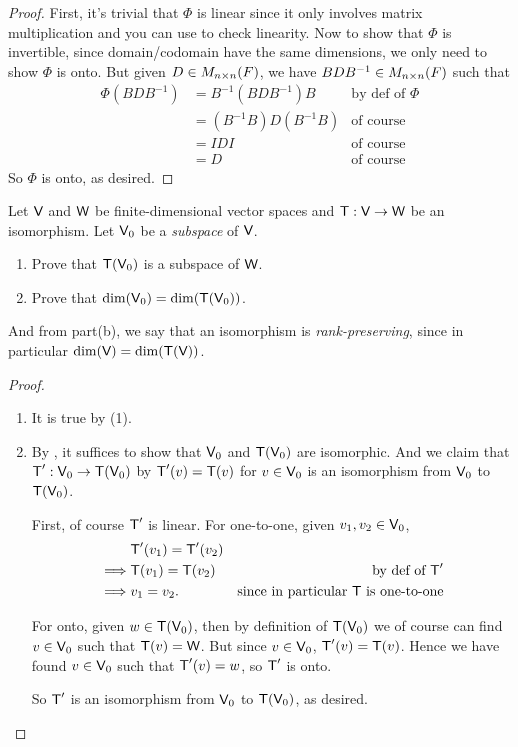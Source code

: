 \begin{proof}
First, it's trivial that \(\Phi\) is linear since it only involves matrix multiplication and you can use  to check linearity.
Now to show that \(\Phi\) is invertible, since domain/codomain have the same dimensions, we only need to show \(\Phi\) is onto.
But given \(D \in M_{n \times n}(F)\), we have \(B D B^{-1} \in M_{n \times n}(F)\) such that
\begin{align*}
    \Phi(B D B^{-1}) & = B^{-1} (B D B^{-1}) B & \text{by def of \(\Phi\)} \\
                     & = (B^{-1}B) D (B^{-1} B) & \text{of course} \\
                     & = IDI & \text{of course} \\
                     & = D & \text{of course}
\end{align*}
So \(\Phi\) is onto, as desired.
\end{proof}

\begin{exercise} \label{exercise 2.4.17}
Let \(\textsf{V}\) and \(\textsf{W}\) be finite-dimensional vector spaces and \(\textsf{T} : \textsf{V} \to \textsf{W}\) be an isomorphism.
Let \(\textsf{V}_0\) be a \emph{subspace} of \(\textsf{V}\).
\begin{enumerate}
\item Prove that \(\textsf{T}(\textsf{V}_0)\) is a subspace of \(\textsf{W}\).
\item Prove that \(\dim(\textsf{V}_0) = \dim(\textsf{T}(\textsf{V}_0))\).
\end{enumerate}
And from part(b), we say that an isomorphism is \emph{rank-preserving}, since in particular \(\dim(\textsf{V}) = \dim(\textsf{T}(\textsf{V}))\).
\end{exercise}

\begin{proof} \ 

\begin{enumerate}
\item It is true by (1).
\item By , it suffices to show that \(\textsf{V}_0\) and \(\textsf{T}(\textsf{V}_0)\) are isomorphic.
And we claim that \(\textsf{T}' : \textsf{V}_0 \to \textsf{T}(\textsf{V}_0)\) by \(\textsf{T}'(v) = \textsf{T}(v)\) for \(v \in \textsf{V}_0\) is an isomorphism from \(\textsf{V}_0\) to \(\textsf{T}(\textsf{V}_0)\).

First, of course \(\textsf{T}'\) is linear.
For one-to-one, given \(v_1, v_2 \in \textsf{V}_0\),
\begin{align*}
             & \textsf{T}'(v_1) = \textsf{T}'(v_2) \\
    \implies & \textsf{T}(v_1) = \textsf{T}(v_2) & \text{by def of \(\textsf{T}'\)} \\
    \implies & v_1 = v_2. & \text{since in particular \(\textsf{T}\) is one-to-one}
\end{align*}

For onto, given \(w \in \textsf{T}(\textsf{V}_0)\), then by definition of \(\textsf{T}(\textsf{V}_0)\) we of course can find \(v \in \textsf{V}_0\) such that \(\textsf{T}(v) = \textsf{W}\).
But since \(v \in \textsf{V}_0\), \(\textsf{T}'(v) = \textsf{T}(v)\).
Hence we have found \(v \in \textsf{V}_0\) such that \(\textsf{T}'(v) = w\), so \(\textsf{T}'\) is onto.

So \(\textsf{T}'\) is an isomorphism from \(\textsf{V}_0\) to \(\textsf{T}(\textsf{V}_0)\), as desired.
\end{enumerate}

\end{proof}


